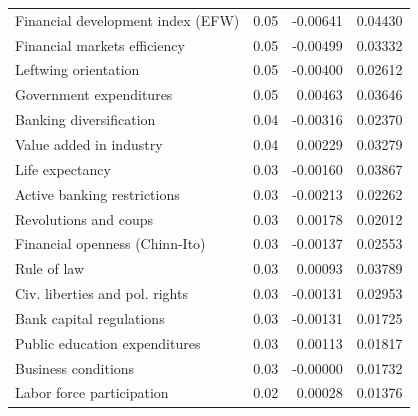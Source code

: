 \documentclass[a4paper,11pt]{article}
\begin{document}
\begin{table}[!ht]
\begin{tabular}{lrrr}
  Financial development index (EFW) & 0.05 & -0.00641 & 0.04430 \\ 
  Financial markets efficiency & 0.05 & -0.00499 & 0.03332 \\ 
  Leftwing orientation & 0.05 & -0.00400 & 0.02612 \\ 
  Government expenditures & 0.05 & 0.00463 & 0.03646 \\ 
  Banking diversification & 0.04 & -0.00316 & 0.02370 \\ 
  Value added in industry & 0.04 & 0.00229 & 0.03279 \\ 
  Life expectancy & 0.03 & -0.00160 & 0.03867 \\ 
  Active banking restrictions & 0.03 & -0.00213 & 0.02262 \\ 
  Revolutions and coups & 0.03 & 0.00178 & 0.02012 \\ 
  Financial openness (Chinn-Ito) & 0.03 & -0.00137 & 0.02553 \\ 
  Rule of law & 0.03 & 0.00093 & 0.03789 \\ 
  Civ. liberties and pol. rights & 0.03 & -0.00131 & 0.02953 \\ 
  Bank capital regulations & 0.03 & -0.00131 & 0.01725 \\ 
  Public education expenditures & 0.03 & 0.00113 & 0.01817 \\ 
  Business conditions & 0.03 & -0.00000 & 0.01732 \\ 
  Labor force participation & 0.02 & 0.00028 & 0.01376 \\  
  \midrule
  \bottomrule
\end{tabular}
\end{table}

\clearpage
\end{document}
